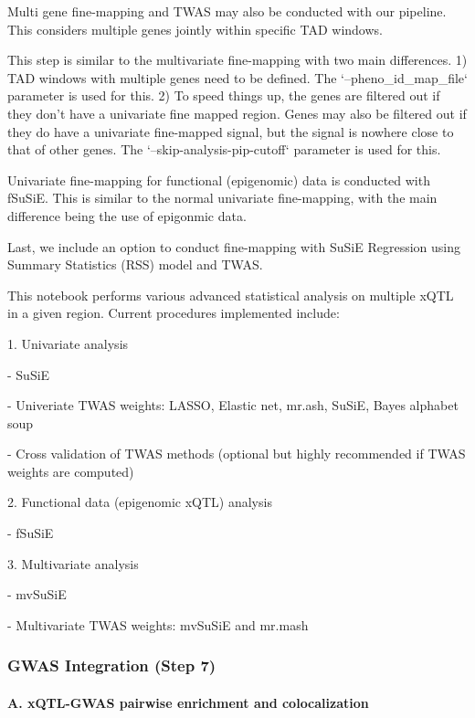 \documentclass[12pt]{article}
\begin{document}
Multi gene fine-mapping and TWAS may also be conducted with our pipeline. This considers multiple genes jointly within specific TAD windows.



This step is similar to the multivariate fine-mapping with two main differences. 1) TAD windows with multiple genes need to be defined. The `--pheno\_id\_map\_file` parameter is used for this. 2) To speed things up, the genes are filtered out if they don't have a univariate fine mapped region. Genes may also be filtered out if they do have a univariate fine-mapped signal, but the signal is nowhere close to that of other genes.  The `--skip-analysis-pip-cutoff` parameter is used for this.




Univariate fine-mapping for functional (epigenomic) data is conducted with fSuSiE. This is similar to the normal univariate fine-mapping, with the main difference being the use of epigonmic data.


Last, we include an option to conduct fine-mapping with SuSiE Regression using Summary Statistics (RSS) model and TWAS.


This notebook performs various advanced statistical analysis on multiple xQTL in a given region. Current procedures implemented include:



1. Univariate analysis

- SuSiE

- Univeriate TWAS weights: LASSO, Elastic net, mr.ash, SuSiE, Bayes alphabet soup

- Cross validation of TWAS methods (optional but highly recommended if TWAS weights are computed)

2. Functional data (epigenomic xQTL) analysis

- fSuSiE

3. Multivariate analysis

- mvSuSiE

- Multivariate TWAS weights: mvSuSiE and mr.mash

\subsubsection*{GWAS Integration (Step 7)}

\paragraph*{A.  xQTL-GWAS pairwise enrichment and colocalization}
\end{document}
